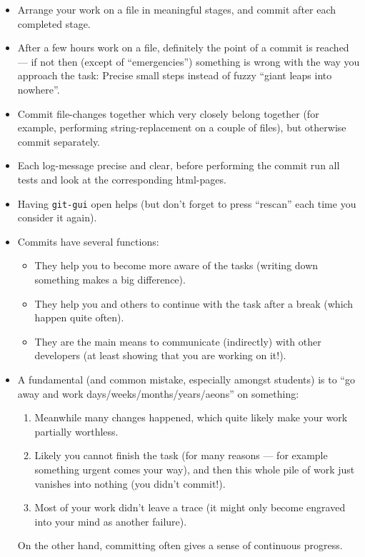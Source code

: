 \documentclass{book}
\begin{document}
\begin{itemize}
\item Arrange your work on a file in meaningful stages, and commit after each completed stage.
\item After a few hours work on a file, definitely the point of a commit is reached --- if not then (except of ``emergencies'') something is wrong with the way you approach the task: Precise small steps instead of fuzzy ``giant leaps into nowhere''.
\item Commit file-changes together which very closely belong together (for example, performing string-replacement on a couple of files), but otherwise commit separately.
\item Each log-message precise and clear, before performing the commit run all tests and look at the corresponding html-pages.
\item Having \texttt{git-gui} open helps (but don't forget to press ``rescan'' each time you consider it again).
\item Commits have several functions:
  \begin{itemize}
  \item They help you to become more aware of the tasks (writing down something makes a big difference).
  \item They help you and others to continue with the task after a break (which happen quite often).
  \item They are the main means to communicate (indirectly) with other developers (at least showing that you are working on it!).
  \end{itemize}
\item A fundamental (and common mistake, especially amongst students) is to ``go away and work days/weeks/months/years/aeons'' on something:
  \begin{enumerate}
  \item Meanwhile many changes happened, which quite likely make your work partially worthless.
  \item Likely you cannot finish the task (for many reasons --- for example something urgent comes your way), and then this whole pile of work just vanishes into nothing (you didn't commit!).
  \item Most of your work didn't leave a trace (it might only become engraved into your mind as another failure).
  \end{enumerate}
  On the other hand, committing often gives a sense of continuous progress.
\end{itemize}
\end{document}
